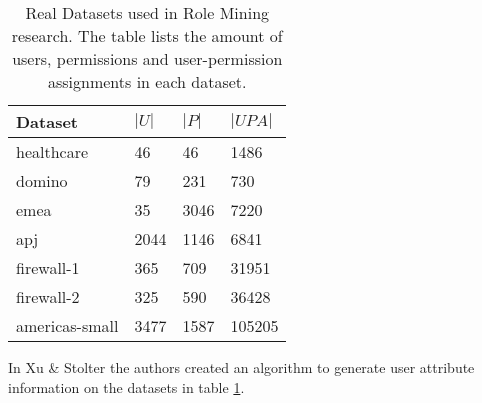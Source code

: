 \begin{table}[H]
    \centering
    \begin{tabular}{|l|l|l|l|}
        \hline
        \rowcolor{myGray} 
        \textbf{Dataset} & \textbf{$|U|$} & \textbf{$|P|$} & \textbf{$|UPA|$} \\ \hline
        healthcare       & 46             & 46                   & 1486                                 \\ \hline
        domino           & 79             & 231                  & 730                                  \\ \hline
        emea             & 35             & 3046                 & 7220                                 \\ \hline
        apj              & 2044           & 1146                 & 6841                                 \\ \hline
        firewall-1       & 365            & 709                  & 31951                                \\ \hline
        firewall-2       & 325            & 590                  & 36428                                \\ \hline
        americas-small   & 3477           & 1587                 & 105205                               \\ \hline
    \end{tabular}
    \caption{Real Datasets used in Role Mining research. The table lists the amount of users, permissions and user-permission assignments in each dataset.}
    \label{tab:realDatasets}
\end{table}

In Xu \& Stolter\cite{Xu} the authors created an algorithm to generate user attribute information on the datasets in table \ref{tab:realDatasets}.

